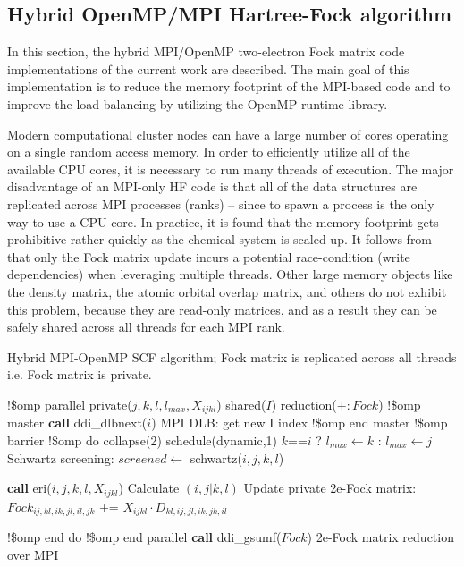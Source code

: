 \subsection{Hybrid OpenMP/MPI Hartree-Fock algorithm}
\label{ssec:omp}
In this section, the hybrid MPI/OpenMP two-electron Fock matrix code implementations of the current work are described. The main goal of this implementation is to reduce the memory footprint of the MPI-based code and to improve the load balancing by utilizing the OpenMP runtime library.

Modern computational cluster nodes can have a large number of cores operating on a single random access memory. In order to efficiently utilize all of the available CPU cores, it is necessary to run many threads of execution. The major disadvantage of an MPI-only HF code is that all of the data structures are replicated across MPI processes (ranks) -- since to spawn a process is the only way to use a CPU core. In practice, it is found that the memory footprint gets prohibitive rather quickly as the chemical system is scaled up. It follows from  that only the Fock matrix update incurs a potential race-condition (write dependencies) when leveraging multiple threads. Other large memory objects like the density matrix, the atomic orbital overlap matrix, and others do not exhibit this problem, because they are read-only matrices, and as a result they can be safely shared across all threads for each MPI rank.

\begin{algorithm}[t]
\caption{Hybrid MPI-OpenMP SCF algorithm; Fock matrix is replicated across all threads i.e. Fock matrix is private.}\label{alg:omp}
\begin{algorithmic}[1]

\State !\$omp parallel private($j,k,l,l_{max},X_{ijkl}$) shared($I$) 
\Statex[1] reduction($+:Fock$)
\Loop
\State !\$omp master
    \State \textbf{call} ddi\_dlbnext($i$)		\Comment MPI DLB: get new I index
\State !\$omp end master
\State !\$omp barrier
\State !\$omp do collapse(2) schedule(dynamic,1)
        	\State $k$==$i$ ? $l_{max}\gets k$ : $l_{max}\gets j$
            	\LeftComment Schwartz screening:
                \State $screened\gets$ schwartz($i,j,k,l$) 
                	
                    \State \textbf{call} eri($i,j,k,l,X_{ijkl}$) \Comment Calculate $(i,j|k,l)$
                    \LeftComment Update private 2e-Fock matrix:
            		\State $Fock_{ij,kl,ik,jl,il,jk}$ += 
                    \Statex[7] $X_{ijkl}\cdot D_{kl,ij,jl,ik,jk,il}$
                            
                \EndIf
            \EndFor
            \EndFor
    \EndFor
\State !\$omp end do
\EndLoop
\State !\$omp end parallel
\State \textbf{call} ddi\_gsumf($Fock$) \Comment 2e-Fock matrix reduction over MPI
\end{algorithmic}
\end{algorithm}

